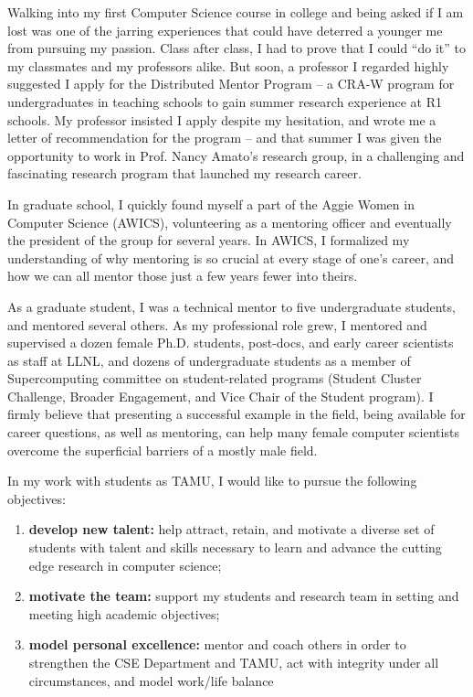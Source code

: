\documentclass[11pt]{article}
\begin{document}
Walking into my first Computer Science course in college and being asked if I am lost
was one of the jarring experiences that could have deterred a younger me from pursuing my passion.
Class after class, I had to prove that I could ``do it'' to my classmates and my professors alike.
But soon, a professor I regarded highly suggested I apply for the Distributed Mentor Program --
a CRA-W program for undergraduates in teaching schools to gain summer research experience at R1 schools.
My professor insisted I apply despite my hesitation, and wrote me a letter of recommendation for the program --
and that summer I was given the opportunity to work in Prof. Nancy Amato's research group,
in a challenging and fascinating research program that launched my research career.

In graduate school, I quickly found myself a part of the Aggie Women in Computer Science (AWICS), volunteering as a mentoring officer
and eventually the president of the group for several years.  In AWICS, I formalized my understanding of why
mentoring is so crucial at every stage of one's career, and how we can all mentor those just a few years
fewer into theirs.

As a graduate student, I was a technical mentor to five undergraduate students, and mentored several others.
As my professional role grew, I mentored and supervised a dozen female Ph.D. students, post-docs,
and early career scientists as staff at LLNL, and dozens of undergraduate students as a member of
Supercomputing committee on student-related programs (Student Cluster Challenge, Broader Engagement,
and Vice Chair of the Student program).  I firmly believe that presenting a successful example in the field,
being available for career questions, as well as mentoring, can help many female computer scientists overcome the superficial barriers of a mostly male field.

In my work with students as TAMU, I would like to pursue the following objectives:
\begin{enumerate}
\item {\bf develop new talent:} help attract, retain, and motivate a diverse set of students with talent and skills necessary to learn and advance the cutting edge research in computer science;
\item {\bf motivate the team:} support my students and research team in setting and meeting high academic objectives;
\item {\bf model personal excellence:} mentor and coach others in order to strengthen the CSE Department and TAMU, act with integrity under all circumstances, and model work/life balance
\end{enumerate}
\end{document}

